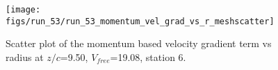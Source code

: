 \begin{figure}[H]
\centering
\texttt{[image: figs/run\_53/run\_53\_momentum\_vel\_grad\_vs\_r\_meshscatter]}
\caption{Scatter plot of the momentum based velocity gradient term vs radius at $z/c$=9.50, $V_{free}$=19.08, station 6.}
\label{fig:run_53_momentum_vel_grad_vs_r_meshscatter}
\end{figure}


